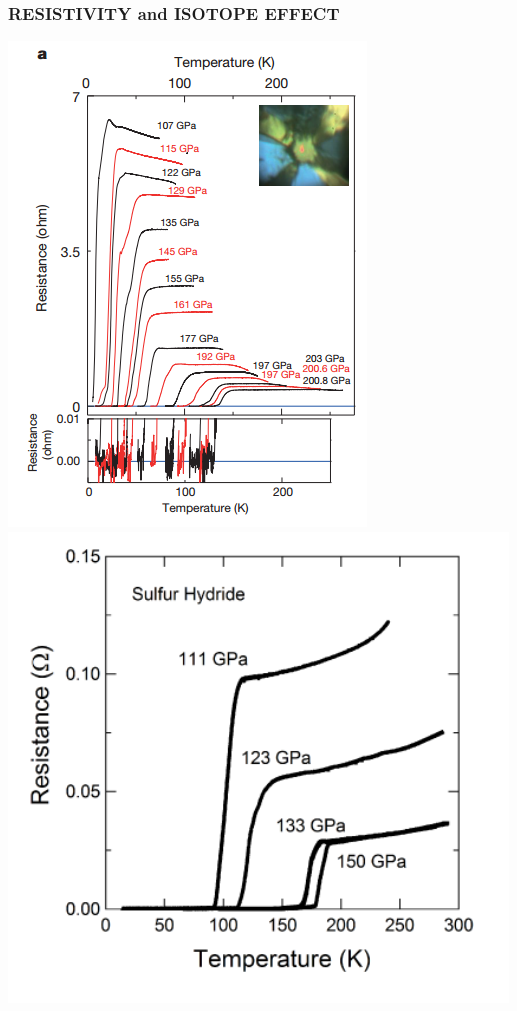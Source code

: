 \documentclass[amssymb,amsmath]{beamer}
\begin{document}
\begin{frame}
\frametitle{RESISTIVITY and ISOTOPE EFFECT}
\centering
\includegraphics[scale=0.3]{./figures/resistivity_drozdov.png} 
\includegraphics[scale=0.3]{./figures/resistivity_einaga.png}

\end{frame}
\end{document}
